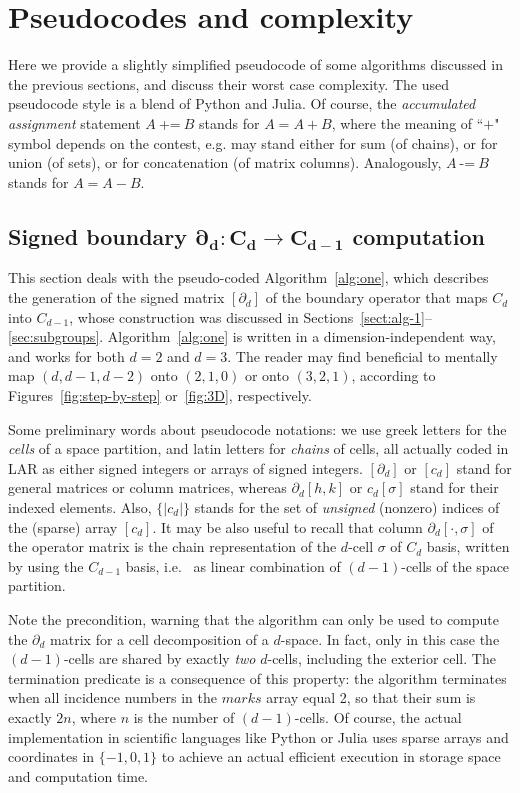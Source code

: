 \section{Pseudocodes and complexity}
\label{sec:complexity}

Here we provide a slightly simplified pseudocode of some algorithms discussed in the previous sections,
and discuss their worst case complexity.  The used pseudocode style {is a blend of} Python and Julia. 
Of course, the \emph{accumulated assignment} statement $A\ $+=$\ B$ stands for $A = A + B$, where the meaning of ``$+$" symbol depends on the contest, e.g. may stand either  for sum (of chains), or for union (of sets), or for concatenation (of matrix columns). Analogously, $A\ $-=$\ B$ stands for $A = A - B$.

\subsection{Signed boundary $\mathbf{\partial_{d} : C_{d} \to C_{{d}-1}}$ computation}
\label{sec:pseudocode}

This section deals with the pseudo-coded Algorithm~\ref{alg:one}, which describes the generation of the signed matrix $[\partial_d]$ of the boundary operator that maps $C_d$ into $C_{d-1}$, whose construction was discussed in Sections~\ref{sect:alg-1}--\ref{sec:subgroups}. 
Algorithm~\ref{alg:one} is written in a dimension-independent way, and works for both $d=2$ and  $d=3$. The reader may find beneficial to mentally map $(d, d-1, d-2)$ onto $(2,1,0)$ or onto $(3,2,1)$, according to Figures~\ref{fig:step-by-step} or~\ref{fig:3D}, respectively. 

Some preliminary words about pseudocode notations: we use greek letters for the \emph{cells} of a space partition, and latin letters for  \emph{chains} of cells, all actually coded in LAR as either signed integers or arrays of signed integers.  $[\partial_d]$ or $[c_d]$ stand for general matrices or column matrices, whereas $\partial_d[h,k]$ or $c_d[\sigma]$ stand for their indexed elements. Also, $\{|c_d|\}$ stands for the set of \emph{unsigned} (nonzero) indices of the (sparse) array $[c_d]$.  It may be also useful to recall that column $\partial_d[\cdot,\sigma]$  of the operator matrix is the chain representation of the $d$-cell $\sigma$ of  $C_d$ basis, written by using the $C_{d-1}$ basis, i.e.~ as linear combination of $(d-1)$-cells of the space partition. 

Note the precondition, warning that the algorithm can only be used to compute the $\partial_d$ matrix for a cell decomposition of a $d$-space. In fact, only in this case the $(d-1)$-cells are shared by exactly \emph{two} $d$-cells, including the exterior cell. The termination predicate is a consequence of this property: the algorithm terminates when all incidence numbers in the $marks$ array equal 2, so that their sum is exactly $2n$, where $n$ is the number of $(d-1)$-cells. Of course, the actual implementation in scientific languages like Python or Julia uses sparse arrays and coordinates in $\{-1,0,1\}$ to achieve an actual efficient execution in storage space and computation time.


